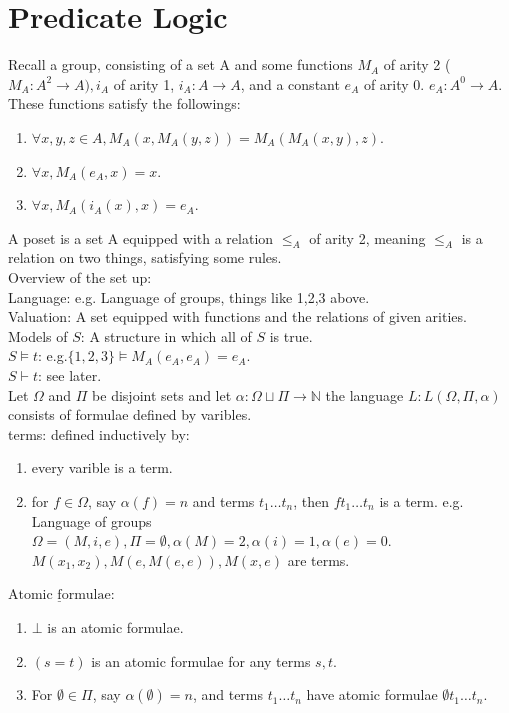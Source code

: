 \section{Predicate Logic}
Recall a group, consisting of a set A and some functions $M_A$ of arity 2
($M_A: A^2 \rightarrow A), i_A$ of arity 1, $i_A: A \rightarrow A$, and a
constant $e_A$ of arity 0. $e_A: A^0 \rightarrow A$. These functions satisfy the followings:
\begin{enumerate}
\item $\forall x,y,z \in A, M_A(x,M_A(y,z))=M_A(M_A(x,y),z)$.\\
\item $\forall x, M_A(e_A,x)=x$.\\
\item $\forall x, M_A(i_A(x),x)=e_A$.
\end{enumerate}
A poset is a set A equipped with a relation $\le_A$ of arity 2,
meaning $\le_A$ is a relation on two things, satisfying some rules.\\
Overview of the set up:\\
Language: e.g. Language of groups, things like 1,2,3 above.\\
Valuation: A set equipped with functions and the relations of given arities.\\
Models of $S$: A structure in which all of $S$ is true.\\
$S \models t$: e.g.$\{1,2,3\} \models M_A(e_A,e_A)=e_A$.\\
$S \vdash t$: see later.\\
Let $\Omega$ and $\Pi$ be disjoint sets and let $\alpha: \Omega \sqcup \Pi \rightarrow \mathbb{N}$
the language $L: L(\Omega,\Pi,\alpha)$ consists of formulae defined by varibles.\\
terms: defined inductively by:
\begin{enumerate}
\item every varible is a term.\\
\item for $f \in \Omega$, say $\alpha(f) = n$ and terms $t_1 \ldots t_n$, then
$ft_1 \ldots t_n$ is a term.
e.g. Language of groups $\Omega = (M, i, e), \Pi = \emptyset, \alpha(M)=2, \alpha(i)=1, \alpha(e)=0$.
$M(x_1,x_2), M(e,M(e,e)), M(x,e)$ are terms.
\end{enumerate}
$\underline{\text{Atomic formulae}}$:\\
\begin{enumerate}
\item $\bot$ is an atomic formulae.\\
\item $(s=t)$ is an atomic formulae for any terms $s,t$.\\
\item For $\emptyset \in \Pi$, say $\alpha(\emptyset)=n$, and terms $t_1 \ldots t_n$ have atomic formulae $\emptyset t_1 \ldots t_n$.
\end{enumerate}
